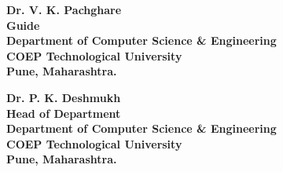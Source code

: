 {    \begin{center}
        \begin{minipage}[t]{0.48\textwidth}
            \raggedright
            \vspace{3em}
            \normalsize\bf Dr. V. K. Pachghare\\
            Guide\\
            Department of Computer Science \& Engineering\\
            COEP Technological University\\
            Pune, Maharashtra.
        \end{minipage}
        \hfill
        \begin{minipage}[t]{0.48\textwidth}
            \raggedleft
            \vspace{3em}
            \normalsize\bf Dr. P. K. Deshmukh\\
            Head of Department\\
            Department of Computer Science \& Engineering\\
            COEP Technological University\\
            Pune, Maharashtra.
        \end{minipage}
    \end{center}

} %
